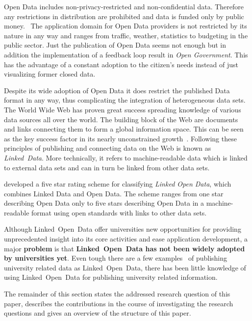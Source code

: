 \documentclass{article}
\begin{document}
Open Data includes non-privacy-restricted and non-confidential data. Therefore any restrictions in distribution are prohibited and data is funded only by public money.~\cite{janssen_benefits_2012} The application domain for Open Data providers is not restricted by its nature in any way and ranges from traffic, weather, statistics to budgeting in the public sector. Just the publication of Open Data seems not enough but in addition the implementation of a feedback loop result in \textit{Open Government}. This has the advantage of a constant adoption to the citizen's needs instead of just visualizing former closed data. 

Despite its wide adoption of Open Data it does restrict the published Data format in any way, thus complicating the integration of heterogeneous data sets. The World Wide Web has proven great success spreading knowledge of various data sources all over the world. The building block of the Web are documents and links connecting them to form a global information space. This can be seen as the key success factor in its nearly unconstrained growth~\cite{jacobs_architecture_2004}. 
Following these principles of publishing and connecting data on the Web is known as \textit{Linked~Data}. More technically, it refers to machine-readable data which is linked to external data sets and can in turn be linked from other data sets. 

\cite{berners-lee_linked_2006} developed a five star rating scheme for classifying \textit{Linked Open Data}, which combines Linked Data and Open Data. The scheme ranges from one star describing Open Data only to five stars describing Open Data in a machine-readable format using open standards with links to other data sets.

Although Linked~Open~Data offer universities new opportunities for providing unprecedented insight into its core activities and ease application development, a major \textbf{problem} is that \textbf{Linked~Open~Data has not been widely adopted by universities yet}. Even tough there are a few examples~\cite{daquin_members_2014} of publishing university related data as Linked~Open~Data, there has been little knowledge of using Linked~Open~Data for publishing university related information. 

The remainder of this section states the addressed research question of this paper, describes the contributions in the course of investigating the research questions and gives an overview of the structure of this paper.
\end{document}
